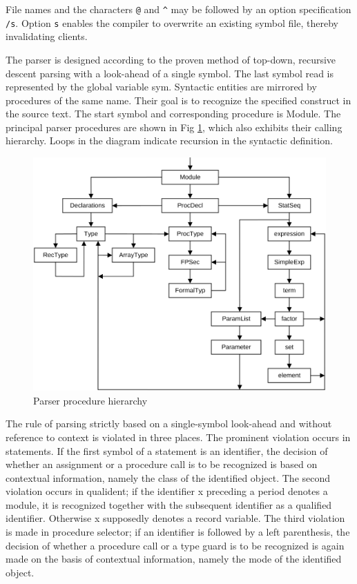 File names and the characters \verb|@| and \verb|^| may be followed by an option specification
\verb|/s|. Option \verb|s| enables the compiler to overwrite an existing symbol file, thereby
invalidating clients.

The parser is designed according to the proven method of top-down, recursive descent parsing with
a look-ahead of a single symbol. The last symbol read is represented by the global variable sym.
Syntactic entities are mirrored by procedures of the same name. Their goal is to recognize the
specified construct in the source text. The start symbol and corresponding procedure is Module.
The principal parser procedures are shown in Fig \ref{fig:pararch}, which also exhibits their calling
hierarchy.  Loops in the diagram indicate recursion in the syntactic definition.
\begin{figure}[h!]
  \centering
  \includegraphics[width=\textwidth]{i/C/6.png}
  \caption{Parser procedure hierarchy}
  \label{fig:pararch}
\end{figure}

The rule of parsing strictly based on a single-symbol look-ahead and without reference to context is
violated in three places. The prominent violation occurs in statements. If the first symbol of a
statement is an identifier, the decision of whether an assignment or a procedure call is to be
recognized is based on contextual information, namely the class of the identified object. The
second violation occurs in qualident; if the identifier x preceding a period denotes a module, it is
recognized together with the subsequent identifier as a qualified identifier. Otherwise x supposedly
denotes a record variable. The third violation is made in procedure selector; if an identifier is
followed by a left parenthesis, the decision of whether a procedure call or a type guard is to be
recognized is again made on the basis of contextual information, namely the mode of the identified
object.

